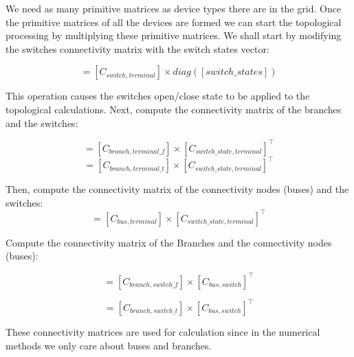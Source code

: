 \documentclass[nols,a4paper,twoside,notoc,fleqn]{tufte-book}
\begin{document}
\vspace{1cm}

We need as many primitive matrices as device types there are in the grid. Once the primitive matrices of all the devices are formed we can start the topological processing by multiplying these primitive matrices. We shall start by modifying the switches connectivity matrix with the switch states vector:

\begin{equation}
	[C_{switch\_state,terminal}] = [C_{switch,terminal}] \times diag([switch\_states])
\end{equation}

This operation causes the switches open/close state to be applied to the topological calculations. Next, compute the connectivity matrix of the branches and the switches:

\begin{equation}
	[C_{branch, switch\_f}] = [C_{branch,terminal\_f}] \times [C_{switch\_state,terminal}]^\top
\end{equation}
\begin{equation}
	[C_{branch, switch\_t}] = [C_{branch,terminal\_t}] \times [C_{switch\_state,terminal}]^\top
\end{equation}

Then, compute the connectivity matrix of the connectivity nodes (buses) and the switches:
\begin{equation}
	[C_{bus, switch}] = [C_{bus,terminal}] \times [C_{switch\_state,terminal}]^\top
\end{equation}

Compute the connectivity matrix of the Branches and the connectivity nodes (buses):

\begin{equation}
	[C_f] = [C_{branch, switch\_f}]  \times [C_{bus, switch}]^\top
\end{equation}

\begin{equation}
	[C_t] = [C_{branch, switch\_t}]  \times [C_{bus, switch}]^\top
\end{equation}

These connectivity matrices are used for calculation since in the numerical methods we only care about buses and branches.
\end{document}
